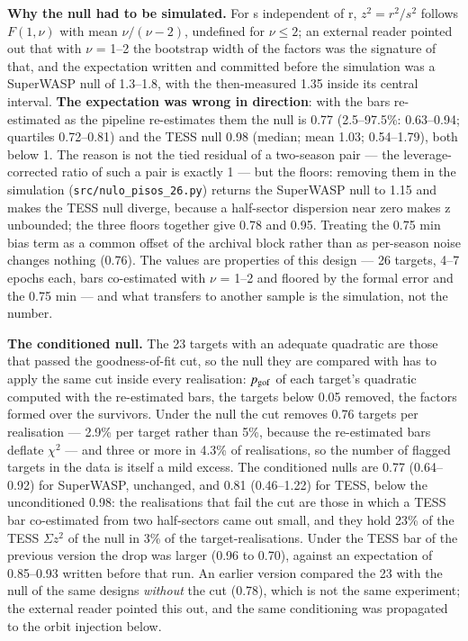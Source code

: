 \documentclass{aa}
\begin{document}
\textbf{Why the null had to be simulated.} For s independent of r, $z^2 = r^2/s^2$ follows $F(1,\nu)$ with mean $\nu/(\nu-2)$, undefined for $\nu \le 2$; an external reader pointed out that with $\nu$ = 1--2 the bootstrap width of the factors was the signature of that, and the expectation written and committed before the simulation was a SuperWASP null of 1.3--1.8, with the then-measured 1.35 inside its central interval. \textbf{The expectation was wrong in direction}: with the bars re-estimated as the pipeline re-estimates them the null is 0.77 (2.5--97.5\%: 0.63--0.94; quartiles 0.72--0.81) and the TESS null 0.98 (median; mean 1.03; 0.54--1.79), both below 1. The reason is not the tied residual of a two-season pair --- the leverage-corrected ratio of such a pair is exactly 1 --- but the floors: removing them in the simulation (\texttt{src/\allowbreak nulo\_\allowbreak pisos\_\allowbreak 26.py}) returns the SuperWASP null to 1.15 and makes the TESS null diverge, because a half-sector dispersion near zero makes z unbounded; the three floors together give 0.78 and 0.95. Treating the 0.75 min bias term as a common offset of the archival block rather than as per-season noise changes nothing (0.76). The values are properties of this design --- 26 targets, 4--7 epochs each, bars co-estimated with $\nu$ = 1--2 and floored by the formal error and the 0.75 min --- and what transfers to another sample is the simulation, not the number.

\textbf{The conditioned null.} The 23 targets with an adequate quadratic are those that passed the goodness-of-fit cut, so the null they are compared with has to apply the same cut inside every realisation: $p_{\rm gof}$ of each target's quadratic computed with the re-estimated bars, the targets below 0.05 removed, the factors formed over the survivors. Under the null the cut removes 0.76 targets per realisation --- 2.9\% per target rather than 5\%, because the re-estimated bars deflate $\chi^2$ --- and three or more in 4.3\% of realisations, so the number of flagged targets in the data is itself a mild excess. The conditioned nulls are 0.77 (0.64--0.92) for SuperWASP, unchanged, and 0.81 (0.46--1.22) for TESS, below the unconditioned 0.98: the realisations that fail the cut are those in which a TESS bar co-estimated from two half-sectors came out small, and they hold 23\% of the TESS $\Sigma z^2$ of the null in 3\% of the target-realisations. Under the TESS bar of the previous version the drop was larger (0.96 to 0.70), against an expectation of 0.85--0.93 written before that run. An earlier version compared the 23 with the null of the same designs \textit{without} the cut (0.78), which is not the same experiment; the external reader pointed this out, and the same conditioning was propagated to the orbit injection below.
\end{document}
